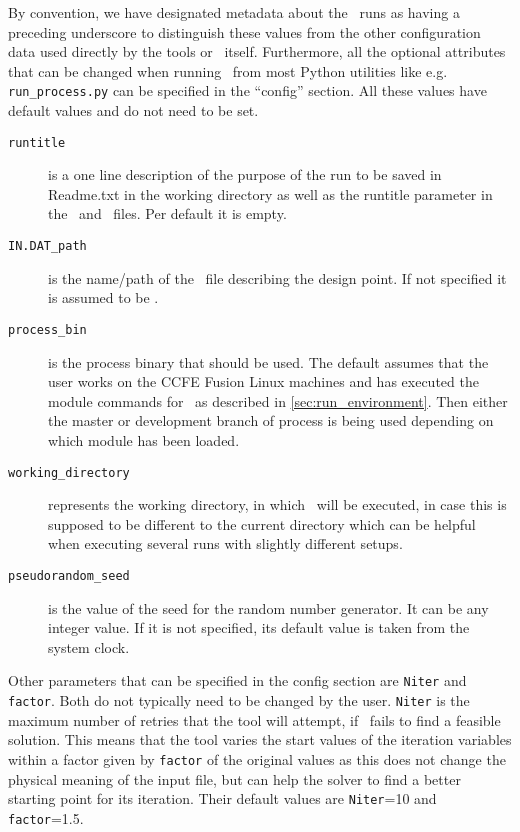 By convention, we have designated metadata about the \process\ runs as having
a preceding underscore to distinguish these values from the other
configuration data used directly by the tools or \process\
itself. Furthermore, all the optional attributes that can be changed when
running \process\ from most Python utilities like
e.g. \texttt{run\_process.py} can be specified in the ``config'' section. All
these values have default values and do not need to be set.
\begin{description}
\item[\texttt{runtitle}] is a one line description of the purpose of the run
  to be saved in Readme.txt in the working directory as well as the runtitle
  parameter in the \outdat\ and \mfile\ files. Per default it is empty.
\item[\texttt{IN.DAT\_path}] is the name/path of the \indat\ file describing
  the design point. If not specified it is assumed to be \indat.
\item[\texttt{process\_bin}] is the process binary that should be used. The
  default assumes that the user works on the CCFE Fusion Linux machines and
  has executed the module commands for \process\ as described in
  \ref{sec:run_environment}. Then either the master or development branch of
  process is being used depending on which module has been loaded.
\item[\texttt{working\_directory}] represents the working directory, in which
  \process\ will be executed, in case this is supposed to be different to the
  current directory which can be helpful when executing several runs with
  slightly different setups.
\item[\texttt{pseudorandom\_seed}] is the value of the seed for the random
  number generator. It can be any integer value. If it is not specified, its
  default value is taken from the system clock.
\end{description}

Other parameters that can be specified in the config section are
\texttt{Niter} and \texttt{factor}. Both do not typically need to be changed
by the user. \texttt{Niter} is the maximum number of retries that the tool
will attempt, if \process\ fails to find a feasible solution. This means that
the tool varies the start values of the iteration variables within a factor
given by \texttt{factor} of the original values as this does not change the
physical meaning of the input file, but can help the solver to find a better
starting point for its iteration. Their default values are \texttt{Niter}=10
and \texttt{factor}=1.5.

